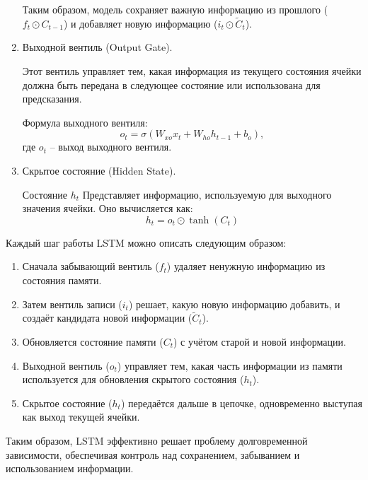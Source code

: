\documentclass[bachelor, och, coursework]{SCWorks}
\begin{document}
\begin{enumerate}
    Таким образом, модель сохраняет важную информацию из прошлого (\(f_t \odot C_{t-1}\)) и добавляет новую информацию (\(i_t \odot \tilde{C}_t\)).
 
    \item Выходной вентиль (Output Gate). 
    
    Этот вентиль управляет тем, какая информация из текущего состояния ячейки должна быть передана в следующее 
    состояние или использована для предсказания.  
    
    Формула выходного вентиля:  
    \begin{equation}
        o_t = \sigma(W_{xo}x_t + W_{ho}h_{t-1} + b_o),
    \end{equation}
     где $o_t$ -- выход выходного вентиля.  
    
    \item Скрытое состояние (Hidden State).  
   
    Состояние $h_t$ Представляет информацию, используемую для выходного значения ячейки. Оно вычисляется как:  
    \begin{equation}
        h_t = o_t \odot \tanh(C_t)
    \end{equation}
  
  \end{enumerate}


  Каждый шаг работы LSTM можно описать следующим образом:  

  \begin{enumerate}
    \item Сначала забывающий вентиль (\(f_t\)) удаляет ненужную информацию из состояния памяти.  
    \item Затем вентиль записи (\(i_t\)) решает, какую новую информацию добавить, и создаёт кандидата новой информации (\(\tilde{C}_t\)).  
    \item Обновляется состояние памяти (\(C_t\)) с учётом старой и новой информации.  
    \item Выходной вентиль (\(o_t\)) управляет тем, какая часть информации из памяти используется для обновления скрытого состояния (\(h_t\)).  
    \item Скрытое состояние (\(h_t\)) передаётся дальше в цепочке, одновременно выступая как выход текущей ячейки.  
  \end{enumerate}

  Таким образом, LSTM эффективно решает проблему долговременной зависимости, обеспечивая контроль над сохранением, забыванием и использованием информации.
\end{document}
